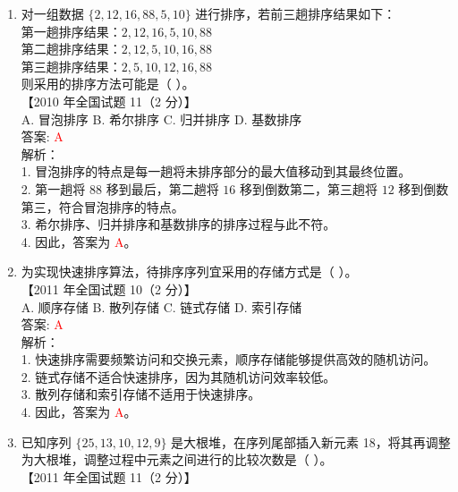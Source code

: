 \documentclass[lang=cn,newtx,10pt,scheme=chinese]{../../../elegantbook}
\begin{document}
\begin{enumerate}
    \item 对一组数据 $\{2, 12, 16, 88, 5, 10\}$ 进行排序，若前三趟排序结果如下：\\
    第一趟排序结果：$2, 12, 16, 5, 10, 88$ \\  
    第二趟排序结果：$2, 12, 5, 10, 16, 88$ \\  
    第三趟排序结果：$2, 5, 10, 12, 16, 88$ \\  
    则采用的排序方法可能是（ ）。\\
    【2010 年全国试题 11（2 分）】\\

    A. 冒泡排序 \quad B. 希尔排序 \quad C. 归并排序 \quad D. 基数排序 \\

    答案: \textcolor{red}{A} \\

    解析：\\
    1. 冒泡排序的特点是每一趟将未排序部分的最大值移动到其最终位置。\\
    2. 第一趟将 $88$ 移到最后，第二趟将 $16$ 移到倒数第二，第三趟将 $12$ 移到倒数第三，符合冒泡排序的特点。\\
    3. 希尔排序、归并排序和基数排序的排序过程与此不符。\\
    4. 因此，答案为 \textcolor{red}{A}。\\

\item 为实现快速排序算法，待排序序列宜采用的存储方式是（ ）。\\
    【2011 年全国试题 10（2 分）】\\

    A. 顺序存储 \quad B. 散列存储 \quad C. 链式存储 \quad D. 索引存储 \\

    答案: \textcolor{red}{A} \\

    解析：\\
    1. 快速排序需要频繁访问和交换元素，顺序存储能够提供高效的随机访问。\\
    2. 链式存储不适合快速排序，因为其随机访问效率较低。\\
    3. 散列存储和索引存储不适用于快速排序。\\
    4. 因此，答案为 \textcolor{red}{A}。\\

\item 已知序列 $\{25, 13, 10, 12, 9\}$ 是大根堆，在序列尾部插入新元素 18，将其再调整为大根堆，调整过程中元素之间进行的比较次数是（ ）。\\
    【2011 年全国试题 11（2 分）】\\


\end{enumerate}
\end{document}
